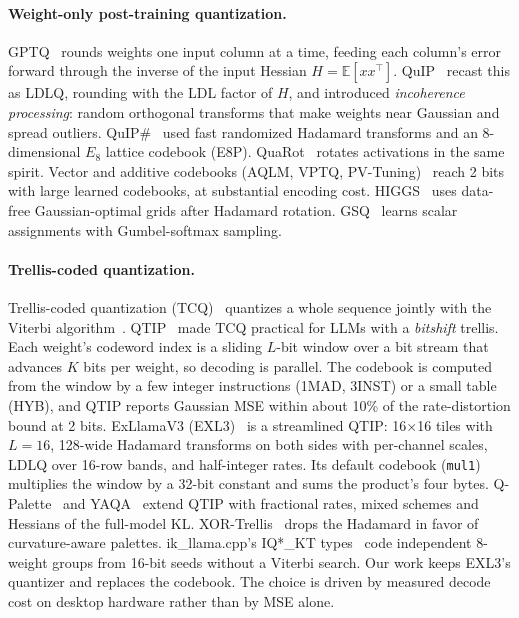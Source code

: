 \documentclass[10pt]{article}
\begin{document}
\paragraph{Weight-only post-training quantization.}
GPTQ~\cite{gptq} rounds weights one input column at a time, feeding each column's error forward through the inverse of
the input Hessian $H = \mathbb{E}[x x^\top]$. QuIP~\cite{quip} recast this as LDLQ, rounding with the LDL factor of
$H$, and introduced \emph{incoherence processing}: random orthogonal transforms that make weights near Gaussian and
spread outliers. QuIP\#~\cite{quipsharp} used fast randomized Hadamard transforms and an 8-dimensional $E_8$ lattice
codebook (E8P). QuaRot~\cite{quarot} rotates activations in the same spirit. Vector and additive codebooks (AQLM, VPTQ,
PV-Tuning)~\cite{aqlm,vptq,pvtuning} reach 2 bits with large learned codebooks, at substantial encoding cost.
HIGGS~\cite{higgs} uses data-free Gaussian-optimal grids after Hadamard rotation. GSQ~\cite{gsq} learns scalar
assignments with Gumbel-softmax sampling.

\paragraph{Trellis-coded quantization.}
Trellis-coded quantization (TCQ)~\cite{tcq} quantizes a whole sequence jointly with the Viterbi
algorithm~\cite{viterbi}. QTIP~\cite{qtip} made TCQ practical for LLMs with a \emph{bitshift} trellis. Each weight's
codeword index is a sliding $L$-bit window over a bit stream that advances $K$ bits per weight, so decoding is
parallel. The codebook is computed from the window by a few integer instructions (1MAD, 3INST) or a small table (HYB),
and QTIP reports Gaussian MSE within about 10\% of the rate-distortion bound at 2 bits. ExLlamaV3 (EXL3)~\cite{exllamav3}
is a streamlined QTIP: 16$\times$16 tiles with $L = 16$, 128-wide Hadamard transforms on both sides with per-channel
scales, LDLQ over 16-row bands, and half-integer rates. Its default codebook (\texttt{mul1}) multiplies the window by a
32-bit constant and sums the product's four bytes. Q-Palette~\cite{qpalette} and YAQA~\cite{yaqa} extend QTIP with
fractional rates, mixed schemes and Hessians of the full-model KL. XOR-Trellis~\cite{xortrellis} drops the Hadamard in
favor of curvature-aware palettes. ik\_llama.cpp's IQ*\_KT types~\cite{iklamacpp} code independent 8-weight groups from
16-bit seeds without a Viterbi search. Our work keeps EXL3's quantizer and replaces the codebook. The choice is driven
by measured decode cost on desktop hardware rather than by MSE alone.
\end{document}
